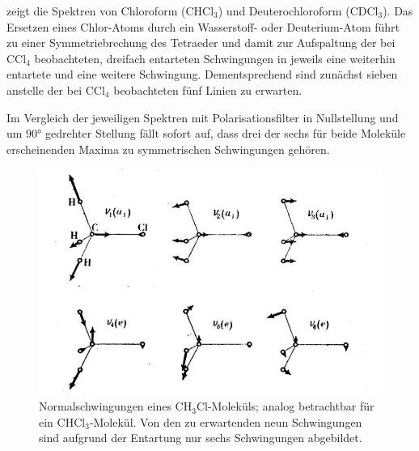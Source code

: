 \documentclass[../bericht.tex]{subfiles}
\begin{document}
         zeigt die Spektren von Chloroform ($\mathrm{CHCl_3}$) und Deuterochloroform ($\mathrm{CDCl_3}$). Das Ersetzen eines Chlor-Atoms durch ein Wasserstoff- oder Deuterium-Atom führt zu einer Symmetriebrechung des Tetraeder und  damit zur Aufspaltung der bei $\mathrm{CCl_4}$ beobachteten, dreifach entarteten Schwingungen in jeweils eine weiterhin entartete und eine weitere Schwingung. Dementsprechend sind zunächst sieben anstelle der bei $\mathrm{CCl_4}$ beobachteten fünf Linien zu erwarten.

        Im Vergleich der jeweiligen Spektren mit Polarisationsfilter in Nullstellung und um $\ang{90}$ gedrehter Stellung fällt sofort auf, dass drei der sechs für beide Moleküle erscheinenden Maxima zu symmetrischen Schwingungen gehören.

        \begin{figure}[tb]
          \includegraphics[width=\textwidth]{figures/ch3cl.png}
          \caption[Normalschwingungen eines $\mathrm{CH_3Cl}$-Moleküls; analog betrachtbar für ein $\mathrm{CHCl_3}$-Molekül.]{Normalschwingungen eines $\mathrm{CH_3Cl}$-Moleküls; analog betrachtbar für ein $\mathrm{CHCl_3}$-Molekül. Von den zu erwartenden neun Schwingungen sind aufgrund der Entartung nur sechs Schwingungen abgebildet. \cite{herzberg}}
          \label{}
        \end{figure}
\end{document}
